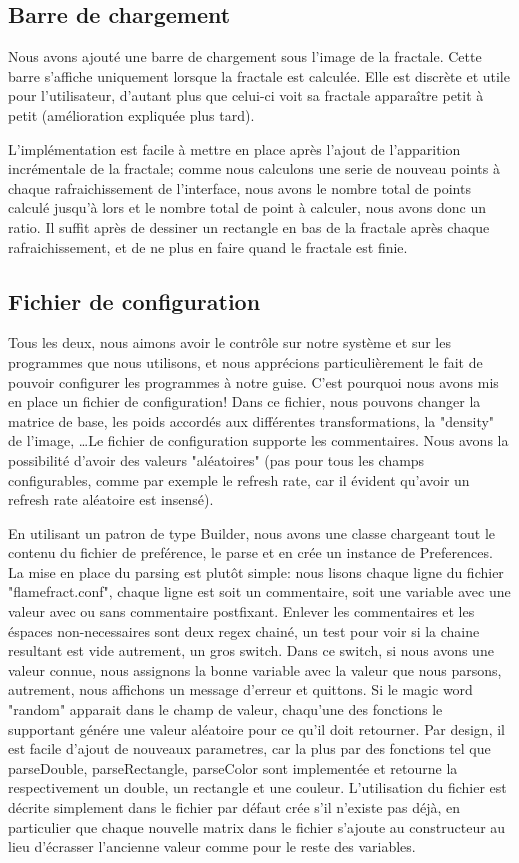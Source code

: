\documentclass[a4paper]{article}
\begin{document}
\subsection*{Barre de chargement}
Nous avons ajouté une barre de chargement sous l'image de la fractale. Cette barre s'affiche uniquement lorsque la fractale est calculée. Elle est discrète et utile pour l'utilisateur, d'autant plus que celui-ci voit sa fractale apparaître petit à petit (amélioration expliquée plus tard).

L'implémentation est facile à mettre en place après l'ajout de l'apparition incrémentale de la fractale; comme nous calculons une serie de nouveau points à chaque rafraichissement de l'interface, nous avons le nombre total de points calculé jusqu'à lors et le nombre total de point à calculer, nous avons donc un ratio. Il suffit après de dessiner un rectangle en bas de la fractale après chaque rafraichissement, et de ne plus en faire quand le fractale est finie.

\subsection*{Fichier de configuration}
Tous les deux, nous aimons avoir le contrôle sur notre système et sur les programmes que nous utilisons, et nous apprécions particulièrement le fait de pouvoir configurer les programmes à notre guise. C'est pourquoi nous avons mis en place un fichier de configuration! Dans ce fichier, nous pouvons changer la matrice de base, les poids accordés aux différentes transformations, la "density" de l'image, \ldots Le fichier de configuration supporte les commentaires. Nous avons la possibilité d'avoir des valeurs "aléatoires" (pas pour tous les champs configurables, comme par exemple le refresh rate, car il évident qu'avoir un refresh rate aléatoire est insensé).

En utilisant un patron de type Builder, nous avons une classe chargeant tout le contenu du fichier de preférence, le parse et en crée un instance de Preferences. La mise en place du parsing est plutôt simple: nous lisons chaque ligne du fichier "flamefract.conf", chaque ligne est soit un commentaire, soit une variable avec une valeur avec ou sans commentaire postfixant. Enlever les commentaires et les éspaces non-necessaires sont deux regex chainé, un test pour voir si la chaine resultant est vide autrement, un gros switch. Dans ce switch, si nous avons une valeur connue, nous assignons la bonne variable avec la valeur que nous parsons, autrement, nous affichons un message d'erreur et quittons. Si le magic word "random" apparait dans le champ de valeur, chaqu'une des fonctions le supportant génére une valeur aléatoire pour ce qu'il doit retourner. Par design, il est facile d'ajout de nouveaux parametres, car la plus par des fonctions tel que parseDouble, parseRectangle, parseColor sont implementée et retourne la respectivement un double, un rectangle et une couleur. L'utilisation du fichier est décrite simplement dans le fichier par défaut crée s'il n'existe pas déjà, en particulier que chaque nouvelle matrix dans le fichier s'ajoute au constructeur au lieu d'écrasser l'ancienne valeur comme pour le reste des variables.
\end{document}
